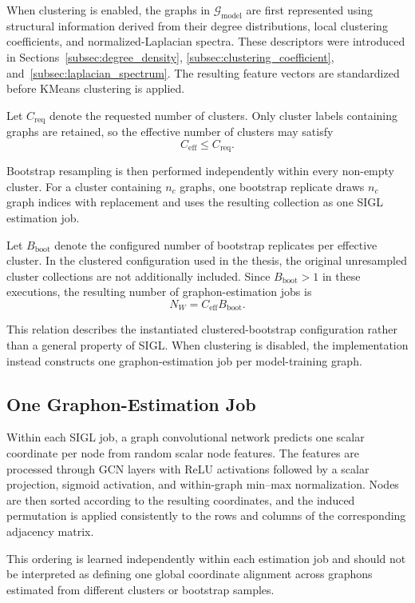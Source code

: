 When clustering is enabled, the graphs in $\mathcal{G}_{\mathrm{model}}$ are first represented using structural information derived from their degree distributions, local clustering coefficients, and normalized-Laplacian spectra. These descriptors were introduced in Sections~\ref{subsec:degree_density}, \ref{subsec:clustering_coefficient}, and~\ref{subsec:laplacian_spectrum}. The resulting feature vectors are standardized before KMeans clustering is applied.

Let \(C_{\mathrm{req}}\) denote the requested number of clusters. Only cluster labels containing graphs are retained, so the effective number of clusters may satisfy
\[
C_{\mathrm{eff}}
\leq
C_{\mathrm{req}}.
\]

Bootstrap resampling is then performed independently within every non-empty cluster. For a cluster containing \(n_c\) graphs, one bootstrap replicate draws \(n_c\) graph indices with replacement and uses the resulting collection as one SIGL estimation job.

Let \(B_{\mathrm{boot}}\) denote the configured number of bootstrap replicates per effective cluster. In the clustered configuration used in the thesis, the original unresampled cluster collections are not additionally included. Since \(B_{\mathrm{boot}}>1\) in these executions, the resulting number of graphon-estimation jobs is
\[
N_W
=
C_{\mathrm{eff}}B_{\mathrm{boot}}.
\]

This relation describes the instantiated clustered-bootstrap configuration rather than a general property of SIGL. When clustering is disabled, the implementation instead constructs one graphon-estimation job per model-training graph.

\subsection{One Graphon-Estimation Job}
\label{subsec:method_sigl_job}

Within each SIGL job, a graph convolutional network predicts one scalar coordinate per node from random scalar node features. The features are processed through GCN layers with ReLU activations followed by a scalar projection, sigmoid activation, and within-graph min--max normalization. Nodes are then sorted according to the resulting coordinates, and the induced permutation is applied consistently to the rows and columns of the corresponding adjacency matrix.

This ordering is learned independently within each estimation job and should not be interpreted as defining one global coordinate alignment across graphons estimated from different clusters or bootstrap samples.

